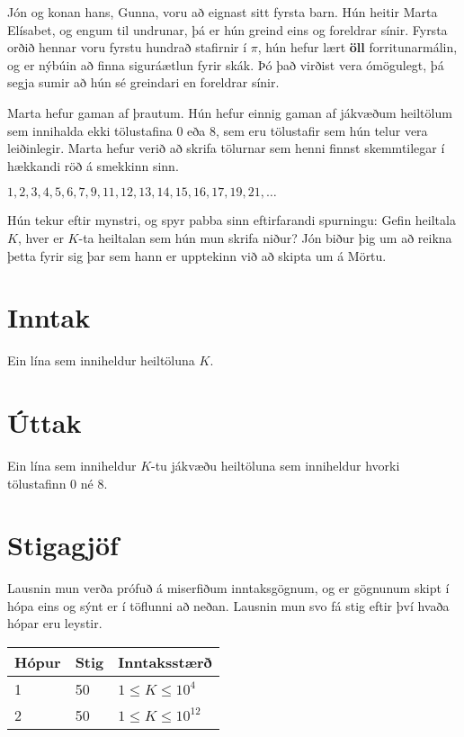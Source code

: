 

Jón og konan hans, Gunna, voru að eignast sitt fyrsta barn. Hún heitir Marta Elísabet,
og engum til undrunar, þá er hún greind eins og foreldrar sínir. Fyrsta orðið hennar
voru fyrstu hundrað stafirnir í $\pi$, hún hefur lært \textbf{öll} forritunarmálin,
og er nýbúin að finna siguráætlun fyrir skák.
Þó það virðist vera ómögulegt, þá segja sumir að hún sé greindari en foreldrar sínir.

Marta hefur gaman af þrautum. Hún hefur einnig gaman af jákvæðum heiltölum sem innihalda
ekki tölustafina $0$ eða $8$, sem eru tölustafir sem hún telur vera leiðinlegir. Marta hefur
verið að skrifa tölurnar sem henni finnst skemmtilegar í hækkandi röð á smekkinn sinn.

\begin{center}
    $1, 2, 3, 4, 5, 6, 7, 9, 11, 12, 13, 14, 15, 16, 17, 19, 21, \ldots$
\end{center}

Hún tekur eftir mynstri, og spyr pabba sinn eftirfarandi spurningu: Gefin heiltala $K$,
hver er $K$-ta heiltalan sem hún mun skrifa niður? Jón biður þig um að reikna þetta
fyrir sig þar sem hann er upptekinn við að skipta um á Mörtu.

\section*{Inntak}
Ein lína sem inniheldur heiltöluna $K$.

\section*{Úttak}
Ein lína sem inniheldur $K$-tu jákvæðu heiltöluna sem inniheldur hvorki tölustafinn $0$ né $8$.

\section*{Stigagjöf}
Lausnin mun verða prófuð á miserfiðum inntaksgögnum, og er gögnunum skipt í
hópa eins og sýnt er í töflunni að neðan. Lausnin mun svo fá stig eftir því
hvaða hópar eru leystir.


\begin{tabular}{|l|l|l|}
\hline
Hópur & Stig & Inntaksstærð  \\ \hline
	1 & 50   & $ 1 \le K \leq 10^{4} $ \\ \hline
	2 & 50   & $ 1 \le K \leq 10^{12}$ \\ \hline
\end{tabular}
